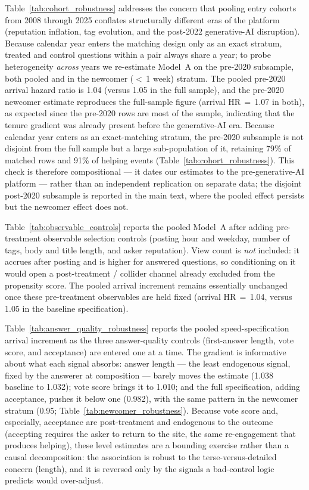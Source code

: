 Table~\ref{tab:cohort_robustness} addresses the concern that pooling entry cohorts from 2008 through 2025 conflates structurally different eras of the platform (reputation inflation, tag evolution, and the post-2022 generative-AI disruption). Because calendar year enters the matching design only as an exact stratum, treated and control questions within a pair always share a year; to probe heterogeneity \emph{across} years we re-estimate Model~A on the pre-2020 subsample, both pooled and in the newcomer ($<$\,1 week) stratum. The pooled pre-2020 arrival hazard ratio is 1.04 (versus 1.05 in the full sample), and the pre-2020 newcomer estimate reproduces the full-sample figure (arrival HR\,$=$\,1.07 in both), as expected since the pre-2020 rows are most of the sample, indicating that the tenure gradient was already present before the generative-AI era. Because calendar year enters as an exact-matching stratum, the pre-2020 subsample is not disjoint from the full sample but a large sub-population of it, retaining 79\% of matched rows and 91\% of helping events (Table~\ref{tab:cohort_robustness}). This check is therefore compositional --- it dates our estimates to the pre-generative-AI platform --- rather than an independent replication on separate data; the disjoint post-2020 subsample is reported in the main text, where the pooled effect persists but the newcomer effect does not.



Table~\ref{tab:observable_controls} reports the pooled Model~A after adding pre-treatment observable selection controls (posting hour and weekday, number of tags, body and title length, and asker reputation). View count is \emph{not} included: it accrues after posting and is higher for answered questions, so conditioning on it would open a post-treatment / collider channel already excluded from the propensity score. The pooled arrival increment remains essentially unchanged once these pre-treatment observables are held fixed (arrival HR\,$=$\,1.04, versus 1.05 in the baseline specification).



Table~\ref{tab:answer_quality_robustness} reports the pooled speed-specification arrival increment as the three answer-quality controls (first-answer length, vote score, and acceptance) are entered one at a time. The gradient is informative about what each signal absorbs: answer length --- the least endogenous signal, fixed by the answerer at composition --- barely moves the estimate (1.038 baseline to 1.032); vote score brings it to 1.010; and the full specification, adding acceptance, pushes it below one (0.982), with the same pattern in the newcomer stratum (0.95; Table~\ref{tab:newcomer_robustness}). Because vote score and, especially, acceptance are post-treatment and endogenous to the outcome (accepting requires the asker to return to the site, the same re-engagement that produces helping), these level estimates are a bounding exercise rather than a causal decomposition: the association is robust to the terse-versus-detailed concern (length), and it is reversed only by the signals a bad-control logic predicts would over-adjust.

